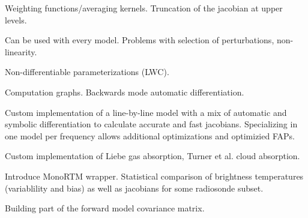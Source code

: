 \startsection[title=Calculating the Jacobian]

    Weighting functions/averaging kernels. Truncation of the jacobian at upper
    levels.

    \startsubsection[title=Finite Differences]

        Can be used with every model. Problems with selection of perturbations,
        non-linearity.
        
    \stopsubsection

    \startsubsection[title=Symbolic Differentiation]

        Non-differentiable parameterizations (LWC).

    \stopsubsection

    \startsubsection[title=Automatic Differentiation]

        Computation graphs. Backwards mode automatic differentiation.
        
    \stopsubsection

\stopsection


\startsection[title=A Numerical Model]

    Custom implementation of a line-by-line model with a mix of automatic and
    symbolic differentiation to calculate accurate and fast jacobians.
    Specializing in one model per frequency allows additional optimizations
    and optimizied FAPs.

    \startsubsection[title=Implementation]

        Custom implementation of Liebe gas absorption, Turner et al. cloud
        absorption.

    \stopsubsection

    \startsubsection[title=Comparison with MonoRTM]

        Introduce MonoRTM wrapper. Statistical comparison of brightness
        temperatures (variablility and bias) as well as jacobians for some
        radiosonde subset.

    \stopsubsection

    \startsubsection[title={Characterizing Errors},reference={ch:rtm_errors}]

        Building part of the forward model covariance matrix.

    \stopsubsection

\stopsection

